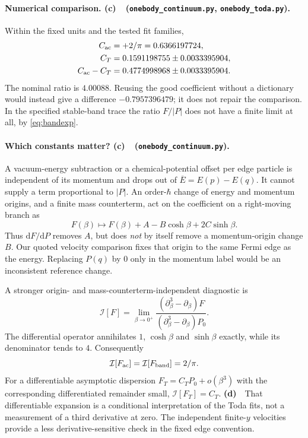 \documentclass[11pt,a4paper]{article}
\newcommand{\Lc}{\textbf{(c)}\ }
\newcommand{\Ld}{\textbf{(d)}\ }
\newcommand{\dd}{\mathrm d}
\newcommand{\CC}{\texttt{onebody\_\allowbreak continuum.py}}
\newcommand{\TT}{\texttt{onebody\_\allowbreak toda.py}}
\begin{document}
\paragraph{Numerical comparison. \Lc\ (\CC, \TT).}
Within the fixed units and the tested fit families,
\begin{align}
 C_{\rm ac}&=+2/\pi=0.6366197724,\\
 C_T&=0.1591198755\pm0.0033395904,\\
 C_{\rm ac}-C_T&=0.4774998968\pm0.0033395904.
\end{align}
The nominal ratio is $4.00088$. Reusing the good coefficient without a
dictionary would instead give a difference $-0.7957396479$; it does not
repair the comparison. In the specified stable-band trace the ratio
$F/|P|$ does not have a finite limit at all, by \eqref{eq:bandexp}.

\paragraph{Which constants matter? \Lc\ (\CC).}
A vacuum-energy subtraction or a chemical-potential offset per edge
particle is independent of its momentum and drops out of
$\overline E=E(p)-E(q)$. It cannot supply a term proportional to $|P|$.
An order-$\hbar$ change of energy and momentum origins, and a finite mass
counterterm, act on the coefficient on a right-moving branch as
\begin{equation}
 F(\beta)\longmapsto F(\beta)+A-B\cosh\beta+2C\sinh\beta.
 \label{eq:origins}
\end{equation}
Thus $\dd F/\dd P$ removes $A$, but does \emph{not} by itself remove a
momentum-origin change $B$. Our quoted velocity comparison fixes that origin
to the same Fermi edge as the energy. Replacing $P(q)$ by $0$ only in the
momentum label would be an inconsistent reference change.

A stronger origin- and mass-counterterm-independent diagnostic is
\begin{equation}
 \mathcal I[F]=\lim_{\beta\to0^+}
 \frac{(\partial_\beta^3-\partial_\beta)F}
      {(\partial_\beta^3-\partial_\beta)P_0}.
 \label{eq:I}
\end{equation}
The differential operator annihilates $1$, $\cosh\beta$ and
$\sinh\beta$ exactly, while its denominator tends to $4$.
Consequently
\begin{equation}
 \mathcal I[F_{\rm ac}]=\mathcal I[F_{\rm band}]=2/\pi.
\end{equation}
For a differentiable asymptotic dispersion $F_T=C_TP_0+o(\beta^3)$ with
the corresponding differentiated remainder small, $\mathcal I[F_T]=C_T$.
\Ld\ That differentiable expansion is a conditional interpretation of the
Toda fits, not a measurement of a third derivative at zero.
The independent finite-$y$ velocities provide a less derivative-sensitive
check in the fixed edge convention.
\end{document}
